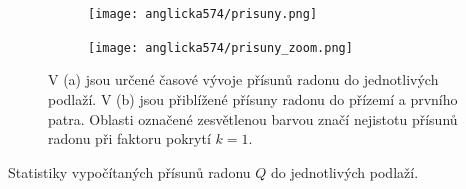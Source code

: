 \begin{figure}[ht]
    \begin{subfigure}{\textwidth}
        \centering
        \texttt{[image: anglicka574/prisuny.png]}
        \caption{}
        \label{fig:anglicka574_prisuny}
    \end{subfigure}
    \begin{subfigure}{\textwidth}
        \centering
        \texttt{[image: anglicka574/prisuny\_zoom.png]}
        \caption{}
        \label{fig:anglicka574_prisunyZoom}
    \end{subfigure}
    \caption{V (a) jsou určené časové vývoje přísunů radonu do jednotlivých podlaží. V (b) jsou přiblížené přísuny radonu do přízemí a prvního patra. Oblasti označené zesvětlenou barvou značí nejistotu přísunů radonu při faktoru pokrytí $k=1$.}
\end{figure}
\begin{table}[H]
    \centering
    \caption{Statistiky vypočítaných přísunů radonu $Q$ do jednotlivých podlaží.}
    \label{tab:anglicka574_prisuny}
    
\end{table}
